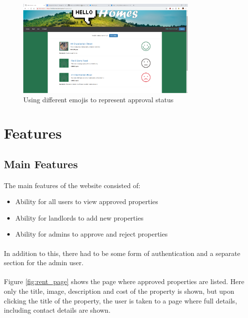 \documentclass{article}
\begin{document}
        \begin{figure}[!htb]
            \centering
            \includegraphics[width=0.8\textwidth]{figures/emoji_status.png}
            \caption[Emoji Status]{Using different emojis to represent approval status}
            \label{fig:emoji_status}
        \end{figure}

\FloatBarrier
\section{Features}
    \subsection{Main Features}
        \paragraph{}
            The main features of the website consisted of:
            \begin{itemize}\itemsep 0pt
                \item Ability for all users to view approved properties
                \item Ability for landlords to add new properties
                \item Ability for admins to approve and reject properties
            \end{itemize}

        \paragraph{}
            In addition to this, there had to be some form of authentication and a separate section for the admin user.

        \paragraph{}
            Figure \ref{fig:rent_page} shows the page where approved properties are listed.
            Here only the title, image, description and cost of the property is shown, but upon clicking the title of the property, the user is taken to a page where full details, including contact details are shown.
\end{document}
